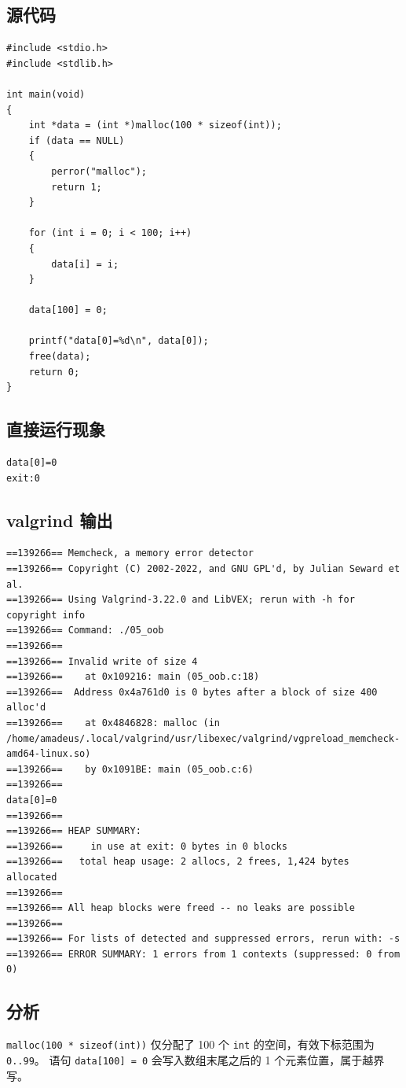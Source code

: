 \documentclass[fleqn]{ctexart}
\begin{document}
\subsection*{源代码}
\begin{verbatim}
#include <stdio.h>
#include <stdlib.h>

int main(void)
{
	int *data = (int *)malloc(100 * sizeof(int));
	if (data == NULL)
	{
		perror("malloc");
		return 1;
	}

	for (int i = 0; i < 100; i++)
	{
		data[i] = i;
	}

	data[100] = 0;

	printf("data[0]=%d\n", data[0]);
	free(data);
	return 0;
}
\end{verbatim}

\subsection*{直接运行现象}
\begin{verbatim}
data[0]=0
exit:0
\end{verbatim}

\subsection*{valgrind 输出}
\begin{verbatim}
==139266== Memcheck, a memory error detector
==139266== Copyright (C) 2002-2022, and GNU GPL'd, by Julian Seward et al.
==139266== Using Valgrind-3.22.0 and LibVEX; rerun with -h for copyright info
==139266== Command: ./05_oob
==139266== 
==139266== Invalid write of size 4
==139266==    at 0x109216: main (05_oob.c:18)
==139266==  Address 0x4a761d0 is 0 bytes after a block of size 400 alloc'd
==139266==    at 0x4846828: malloc (in /home/amadeus/.local/valgrind/usr/libexec/valgrind/vgpreload_memcheck-amd64-linux.so)
==139266==    by 0x1091BE: main (05_oob.c:6)
==139266== 
data[0]=0
==139266== 
==139266== HEAP SUMMARY:
==139266==     in use at exit: 0 bytes in 0 blocks
==139266==   total heap usage: 2 allocs, 2 frees, 1,424 bytes allocated
==139266== 
==139266== All heap blocks were freed -- no leaks are possible
==139266== 
==139266== For lists of detected and suppressed errors, rerun with: -s
==139266== ERROR SUMMARY: 1 errors from 1 contexts (suppressed: 0 from 0)
\end{verbatim}

\subsection*{分析}
\verb|malloc(100 * sizeof(int))| 仅分配了 100 个 \verb|int| 的空间，有效下标范围为 \verb|0..99|。
语句 \verb|data[100] = 0| 会写入数组末尾之后的 1 个元素位置，属于越界写。
\end{document}
